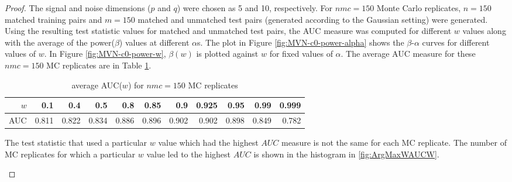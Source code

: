 \documentclass[12pt]{article} %
\begin{document}
\begin{proof}

	


The signal  and noise dimensions ($p$ and $q$) were chosen as 5 and 10, respectively.  For $nmc=150$ Monte Carlo replicates,  $n=150$ matched training pairs and $m=150$ matched and unmatched test pairs (generated according to the Gaussian setting) were generated. Using the resulting test statistic values for matched and unmatched test pairs, the AUC measure was computed for different $w$ values along with the average of the power($\beta$) values at  different $\alpha$s. The plot in Figure \ref{fig:MVN-c0-power-alpha} shows the  $\beta$-$\alpha$ curves for different values of  $w$. In Figure
 \ref{fig:MVN-c0-power-w},  $\beta(w)$ is plotted against $w$ for fixed values of $\alpha$.  
The average AUC measure for these $nmc=150$ MC replicates are  in  Table \ref{tab:AUCW}.

\begin{table}[h]
\centering
\begin{tabular}{rrrrrrrrrrr}
  \hline
$w$ & 0.1 & 0.4 & 0.5 & 0.8 & 0.85 & 0.9 & 0.925 & 0.95 & 0.99 & 0.999 \\ 
  \hline
AUC & 0.811 & 0.822 & 0.834 & 0.886 & 0.896 & 0.902 & 0.902 & 0.898 & 0.849 & 0.782 \\ 
   \hline
\end{tabular}
\caption{average AUC($w$) for $nmc=150$ MC replicates}
	\label{tab:AUCW}
\end{table}


 The test statistic that used a particular $w$ value  which  had the highest $AUC$ measure  is not the same for each MC replicate. The number of  MC replicates  for  which a particular $w$ value led to the highest $AUC$ is shown in  the histogram in 	\ref{fig:ArgMaxWAUCW}.
\begin{figure}[h]
	\centering
	

\end{figure}
\end{proof}
\end{document}

